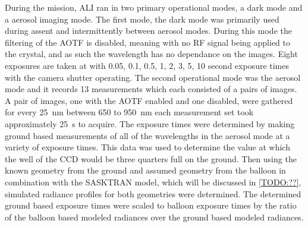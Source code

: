 During the mission, ALI ran in two primary operational modes, a dark mode and a aerosol imaging mode. The first mode, the dark mode was primarily used during assent and intermittently between aerosol modes. During this mode the filtering of the AOTF is disabled, meaning with no RF signal being applied to the crystal, and as such the wavelength has no dependance on the images. Eight exposures are taken at with 0.05, 0.1, 0.5, 1, 2, 3, 5, 10 second exposure times with the camera shutter operating. The second operational mode was the aerosol mode and it records 13 measurements which each consisted of a pairs of images. A pair of images, one with the AOTF enabled and one disabled, were gathered for every 25~nm between 650 to 950~nm each measurement set took approximately 25~s to acquire. The exposure times were determined by making ground based measurements of all of the wavelengths in the aerosol mode at a variety of exposure times. This data was used to determine the value at which the well of the CCD would be three quarters full on the ground. Then using the known geometry from the ground and assumed geometry from the balloon in combination with the SASKTRAN model, which will be discussed in \autoref{TODO:??}, simulated radiance profiles for both geometries were determined. The determined ground based exposure times were scaled to balloon exposure times by the ratio of the balloon based modeled radiances over the ground based modeled radiances. %


